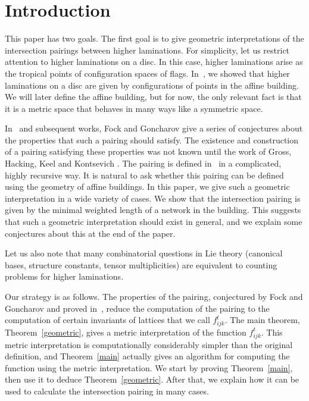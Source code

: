 \section{Introduction}

This paper has two goals. The first goal is to give geometric interpretations of the intersection pairings between higher laminations. For simplicity, let us restrict attention to higher laminations on a disc. In this case, higher laminations arise as the tropical points of configuration spaces of flags. In~\cite{Le}, we showed that higher laminations on a disc are given by configurations of points in the affine building. We will later define the affine building, but for now, the only relevant fact is that it is a metric space that behaves in many ways like a symmetric space.

In~\cite{FG1} and subsequent works, Fock and Goncharov give a series of conjectures about the properties that such a pairing should satisfy. The existence and construction of a pairing satisfying these properties was not known until the work of Gross, Hacking, Keel and Kontsevich \cite{GHKK}. The pairing is defined in~\cite{GHKK} in a complicated, highly recursive way. It is natural to ask whether this pairing can be defined using the geometry of affine buildings. In this paper, we give such a geometric interpretation in a wide variety of cases. We show that the intersection pairing is given by the minimal weighted length of a network in the building. This suggests that such a geometric interpretation should exist in general, and we explain some conjectures about this at the end of the paper.

Let us also note that many combinatorial questions in Lie theory (canonical bases, structure constants, tensor multiplicities) are equivalent to counting problems for higher laminations.

Our strategy is as follows. The properties of the pairing, conjectured by Fock and Goncharov and proved in~\cite{GHKK}, reduce the computation of the pairing to the computation of certain invariants of lattices that we call $f_{ijk}^t$. The main theorem, Theorem~\ref{geometric}, gives a metric interpretation of the function $f_{ijk}^t$. This metric interpretation is computationally considerably simpler than the original definition, and Theorem~\ref{main} actually gives an algorithm for computing the function using the metric interpretation. We start by proving Theorem~\ref{main}, then use it to deduce Theorem~\ref{geometric}. After that, we explain how it can be used to calculate the intersection pairing in many cases.

